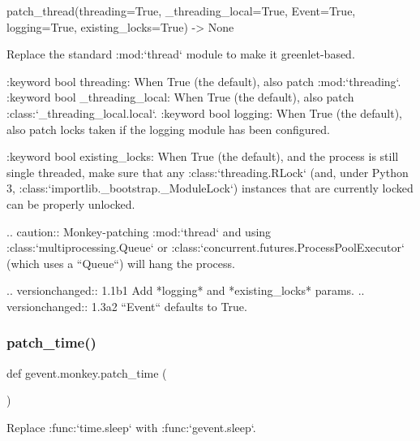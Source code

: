 \begin{DoxyVerb}patch_thread(threading=True, _threading_local=True, Event=True, logging=True, existing_locks=True) -> None

Replace the standard :mod:`thread` module to make it greenlet-based.

:keyword bool threading: When True (the default),
    also patch :mod:`threading`.
:keyword bool _threading_local: When True (the default),
    also patch :class:`_threading_local.local`.
:keyword bool logging: When True (the default), also patch locks
    taken if the logging module has been configured.

:keyword bool existing_locks: When True (the default), and the
    process is still single threaded, make sure that any
    :class:`threading.RLock` (and, under Python 3, :class:`importlib._bootstrap._ModuleLock`)
    instances that are currently locked can be properly unlocked.

.. caution::
    Monkey-patching :mod:`thread` and using
    :class:`multiprocessing.Queue` or
    :class:`concurrent.futures.ProcessPoolExecutor` (which uses a
    ``Queue``) will hang the process.

.. versionchanged:: 1.1b1
    Add *logging* and *existing_locks* params.
.. versionchanged:: 1.3a2
    ``Event`` defaults to True.
\end{DoxyVerb}
 \mbox{\label{namespacegevent_1_1monkey_a28161e4e18de4aa37ea67c6844f46b8d}} 
\subsubsection{\texorpdfstring{patch\+\_\+time()}{patch\_time()}}
{\footnotesize\ttfamily def gevent.\+monkey.\+patch\+\_\+time (\begin{DoxyParamCaption}{ }\end{DoxyParamCaption})}

\begin{DoxyVerb}Replace :func:`time.sleep` with :func:`gevent.sleep`.
\end{DoxyVerb}
 \mbox{\label{namespacegevent_1_1monkey_a56d7bc7df5444f3776834dfc73450ac1}} 
